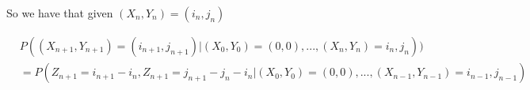 So we have that given $(X_n,Y_n)=(i_n,j_n)$ 

\begin{align*}
&P((X_{n+1},Y_{n+1}) =(i_{n+1},j_{n+1})| (X_0,Y_0)=(0,0),...,(X_n,Y_n)=i_n,j_n)) \\&= P(Z_{n+1}=i_{n+1}-i_n,Z_{n+1}=j_{n+1}-j_{n}-i_n | (X_0,Y_0)=(0,0),...,(X_{n-1},Y_{n-1})=i_{n-1},j_{n-1}) \\

\end{align*}
